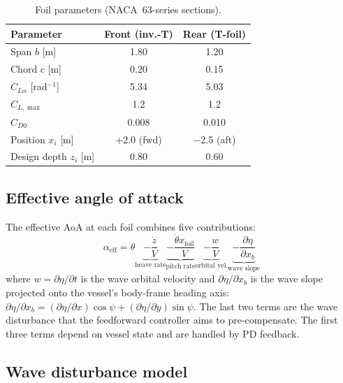 \documentclass[review]{elsarticle}
\begin{document}
\begin{table}[h]
\centering
\caption{Foil parameters (NACA~63-series sections).}
\label{tab:foil_params}
\begin{tabular}{lcc}
\toprule
Parameter & Front (inv.-T) & Rear (T-foil) \\
\midrule
Span $b$ [m]            & 1.80 & 1.20 \\
Chord $c$ [m]           & 0.20 & 0.15 \\
$C_{L\alpha}$ [rad$^{-1}$] & 5.34 & 5.03 \\
$C_{L,\max}$            & 1.2  & 1.2  \\
$C_{D0}$                & 0.008 & 0.010 \\
Position $x_i$ [m]      & +2.0 (fwd) & $-$2.5 (aft) \\
Design depth $z_i$ [m]  & 0.80 & 0.60 \\
\bottomrule
\end{tabular}
\end{table}

\subsection{Effective angle of attack}

The effective AoA at each foil combines five contributions:
\begin{equation}
  \alpha_{\text{eff}} = \theta
    \underbrace{- \frac{\dot{z}}{V}}_{\text{heave rate}}
    \underbrace{- \frac{\dot{\theta} x_{\text{foil}}}{V}}_{\text{pitch rate}}
    \underbrace{- \frac{w}{V}}_{\text{orbital vel.}}
    \underbrace{- \frac{\partial \eta}{\partial x_b}}_{\text{wave slope}}
  \label{eq:alpha_eff}
\end{equation}
where $w = \partial\eta/\partial t$ is the wave orbital velocity and
$\partial\eta/\partial x_b$ is the wave slope projected onto the
vessel's body-frame heading axis:
$\partial\eta/\partial x_b = (\partial\eta/\partial x)\cos\psi + (\partial\eta/\partial y)\sin\psi$.
The last two terms are the wave disturbance that the feedforward
controller aims to pre-compensate.
The first three terms depend on vessel state and are handled by PD
feedback.

\subsection{Wave disturbance model}
\end{document}
